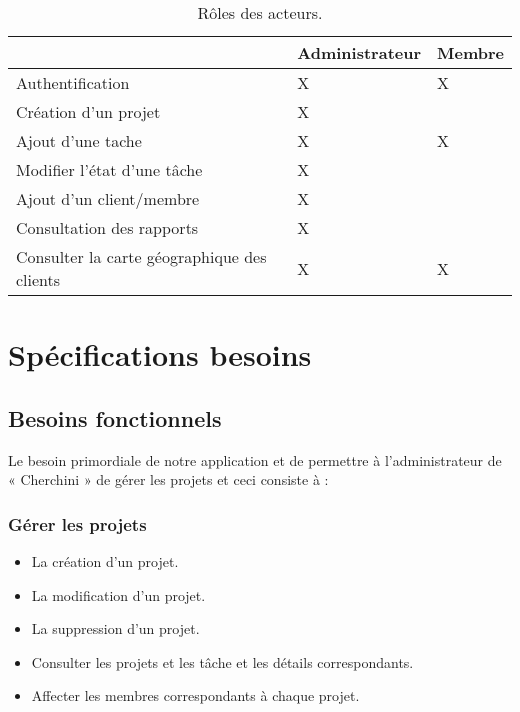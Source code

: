\begin{table}[H]
\centering
\begin{tabular}{|l|l|l|}
\hline
                                            & Administrateur & Membre  \\
\hline
Authentification~                           & X              & X       \\
\hline
Création d’un projet                        & X              &         \\
\hline
Ajout d’une tache                           & X              & X       \\
\hline
Modifier l’état d’une tâche                 & X              &         \\
\hline
Ajout d’un client/membre                    & X              &         \\
\hline
Consultation des rapports                   & X              &         \\
\hline
Consulter la carte géographique des clients & X              & X       \\
\hline
\end{tabular}
\centering
\caption{Rôles  des acteurs.}
\end{table}


\section{ Sp\'{e}cifications besoins}

  \subsection{Besoins fonctionnels}

Le besoin primordiale de notre application et de permettre à l’administrateur
de « Cherchini » de gérer les projets et ceci consiste à :

\subsubsection{G\'{e}rer les projets}

\begin{itemize}
\item{La cr\'{e}ation d’un projet.}
\item{La modification d'un projet.}
\item{La suppression d'un projet.}
\item{Consulter les projets et les t\^{a}che et les d\'{e}tails correspondants.}
\item{Affecter les membres correspondants \`{a} chaque projet.}
\end{itemize}

